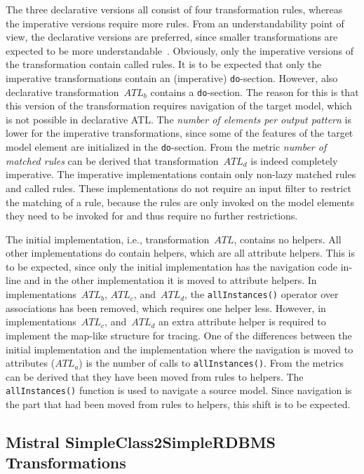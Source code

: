 \documentclass[12pt]{elsarticle}
\begin{document}
The three declarative versions all consist of four transformation rules, whereas
the imperative versions require more rules. From an understandability point of
view, the declarative versions are preferred, since smaller transformations are
expected to be more understandable~\cite{Amstel2011_MtATL}. Obviously, only the
imperative versions of the transformation contain called rules. It is to be
expected that only the imperative transformations contain an (imperative)
\texttt{do}-section. However, also declarative transformation~$ATL_b$ contains a
\texttt{do}-section. The reason for this is that this version of the
transformation requires navigation of the target model, which is not possible in
declarative ATL. The \emph{number of elements per output pattern\/} is lower for
the imperative transformations, since some of the features of the target model
element are initialized in the \texttt{do}-section. From the metric \emph{number
of matched rules\/} can be derived that transformation~$ATL_d$ is indeed
completely imperative. The imperative implementations contain only non-lazy
matched rules and called rules. These implementations do not require an input
filter to restrict the matching of a rule, because the rules are only invoked on
the model elements they need to be invoked for and thus require no further
restrictions.

The initial implementation, i.e., transformation~$ATL$, contains no helpers. All
other implementations do contain helpers, which are all attribute helpers. This
is to be expected, since only the initial implementation has the navigation code
in-line and in the other implementation it is moved to attribute helpers. In
implementations~$ATL_b$, $ATL_c$, and~$ATL_d$, the \texttt{allInstances()}
operator over associations has been removed, which requires one helper less.
However, in implementations~$ATL_c$, and~$ATL_d$ an extra attribute helper is
required to implement the map-like structure for tracing. One of the differences
between the initial implementation and the implementation where the navigation
is moved to attributes ($ATL_a$) is the number of calls to
\texttt{allInstances()}. From the metrics can be derived that they have been
moved from rules to helpers. The \texttt{allInstances()} function is used to
navigate a source model. Since navigation is the part that had been moved from
rules to helpers, this shift is to be expected.

\subsection{Mistral SimpleClass2SimpleRDBMS Transformations}
\end{document}

